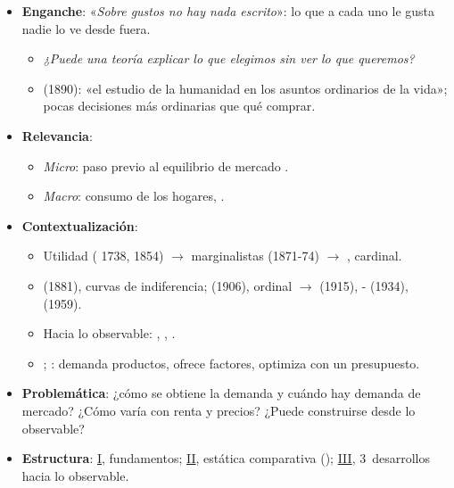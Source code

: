 \documentclass{article}
\begin{document}
\cabecerarepaso
\begin{columnas}

\begin{itemize}
\item \textbf{Enganche}: «\emph{Sobre gustos no hay nada escrito}»: lo que a cada uno le gusta nadie lo ve desde fuera.
  \begin{itemize}
  \item \emph{¿Puede una teoría explicar lo que elegimos sin ver lo que queremos?}
  \item {} (1890): «el estudio de la humanidad en los asuntos ordinarios de la vida»; pocas decisiones más ordinarias que qué comprar.
  \end{itemize}
\item \textbf{Relevancia}:
  \begin{itemize}
  \item \emph{Micro}: paso previo al equilibrio de mercado .
  \item \emph{Macro}: consumo de los hogares, .
  \end{itemize}
\item \textbf{Contextualización}:
  \begin{itemize}
  \item Utilidad ( 1738,  1854) $\to$ marginalistas (1871-74) $\to$ , cardinal.
  \item {} (1881), curvas de indiferencia;  (1906), ordinal $\to$  (1915), - (1934),  (1959).
  \item Hacia lo observable: , , .
  \item {}; : demanda productos, ofrece factores, optimiza con un presupuesto.
  \end{itemize}
\item \textbf{Problemática}: ¿cómo se obtiene la demanda y cuándo hay demanda de mercado? ¿Cómo varía con renta y precios? ¿Puede construirse desde lo observable?
\item \textbf{Estructura}: \hyperref[rep:I]{I}, fundamentos; \hyperref[rep:II]{II}, estática comparativa (); \hyperref[rep:III]{III}, 3~desarrollos hacia lo observable.
\end{itemize}


\end{columnas}
\end{document}
